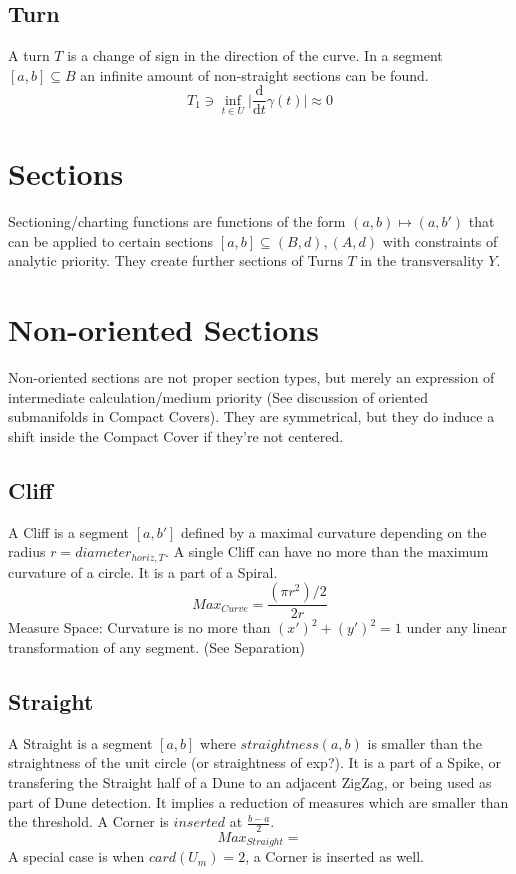 \documentclass{report}
\begin{document}
\subsection{Turn}
A turn $T$ is a change of sign in the direction of the curve. In a segment $[a,b] \subseteq B$ an infinite amount of non-straight sections can be found.
\begin{equation}
T_{1} \ni \inf_{t \in U} \lvert \frac{\mathrm{d}}{\mathrm{d}t}\gamma(t) \rvert \approx 0
\end{equation}

\section*{Sections}
Sectioning/charting functions are functions of the form $(a,b) \mapsto (a,b')$ that can be applied to certain sections $[a,b] \subseteq (B,d),(A,d)$ with constraints of analytic priority. They create further sections of Turns $T$ in the transversality $Y$.

\section{Non-oriented Sections}
Non-oriented sections are not proper section types, but merely an expression of intermediate calculation/medium priority (See discussion of oriented submanifolds in Compact Covers). They are symmetrical, but they do induce a shift inside the Compact Cover if they're not centered.

\subsection{Cliff}
A Cliff is a segment $[a,b']$ defined by a maximal curvature depending on the radius $r=diameter_{horiz,T}$. A single Cliff can have no more than the maximum curvature of a circle. It is a part of a Spiral.
\begin{equation}
Max_{Curve}=\frac{(\pi r^2) /2}{2r}
\end{equation}
Measure Space: Curvature is no more than $(x')^2 + (y')^2 =1$  under any linear transformation of any segment. (See Separation)

\subsection{Straight}
A Straight is a segment $[a,b]$ where $straightness(a,b)$ is smaller than the straightness of the unit circle (or straightness of exp?). It is a part of a Spike, or transfering the Straight half of a Dune to an adjacent ZigZag, or being used as part of Dune detection. It implies a reduction of measures which are smaller than the threshold. A Corner is $inserted$ at $\frac{b-a}{2}$.
\begin{equation}
Max_{Straight}=
\end{equation}
A special case is when $card(U_{m})=2$, a Corner is inserted as well.
\end{document}
